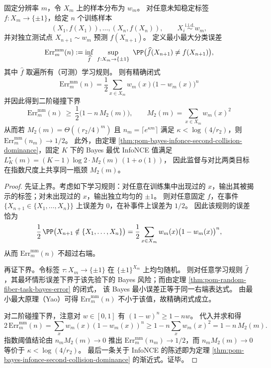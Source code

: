\begin{theorem}[二阶碰撞作为监督与对比学习的共同指数瓶颈]\label{thm:pom-second-order-collision-common-bottleneck}
固定分辨率 \(m\)，令 \(X_m\) 上的样本分布为 \(w_m\)。
对任意未知稳定标签 \(f:X_m\to\{\pm1\}\)，给定 \(n\) 个训练样本
\[
(X_1,f(X_1)),\dots,(X_n,f(X_n)),\qquad X_i\stackrel{\mathrm{i.i.d.}}{\sim}w_m,
\]
并对独立测试点 \(X_{n+1}\sim w_m\) 预测 \(f(X_{n+1})\)。
定义最小最大分类误差
\[
\mathrm{Err}_m^{\mathrm{mm}}(n)
:=\inf_{\widehat f}\ \sup_{f:X_m\to\{\pm1\}}\ \PP\bigl(\widehat f(X_{n+1})\neq f(X_{n+1})\bigr),
\]
其中 \(\widehat f\) 取遍所有（可测）学习规则。
则有精确闭式
\[
\boxed{\;
\mathrm{Err}_m^{\mathrm{mm}}(n)
=\frac12\sum_{x\in X_m}w_m(x)\bigl(1-w_m(x)\bigr)^n\;}
\]
并因此得到二阶碰撞下界
\[
\boxed{\;
\mathrm{Err}_m^{\mathrm{mm}}(n)\ \ge\ \frac12\bigl(1-n\,M_2(m)\bigr),\qquad M_2(m)=\sum_{x\in X_m}w_m(x)^2\;}
\]
从而若 \(M_2(m)=\Theta((r_2/4)^m)\) 且 \(n_m=\lceil e^{\kappa m}\rceil\) 满足 \(\kappa<\log(4/r_2)\)，则 \(\mathrm{Err}_m^{\mathrm{mm}}(n_m)\to 1/2\)。
此外，由定理 \ref{thm:pom-bayes-infonce-second-collision-dominance}，固定 \(K\) 下的 Bayes 最优 InfoNCE 值满足
\(
L_K^\star(m)=(K-1)\log 2\cdot M_2(m)\,(1+o(1))
\)，
因此监督与对比两类目标在指数尺度上共享同一瓶颈 \(M_2(m)\)。
\end{theorem}
\begin{proof}
先证上界。考虑如下学习规则：对任意在训练集中出现过的 \(x\)，输出其被揭示的标签；对未出现过的 \(x\)，输出独立均匀的 \(\pm1\)。
则对任意固定 \(f\)，在事件 \(\{X_{n+1}\in\{X_1,\dots,X_n\}\}\) 上误差为 \(0\)，在补事件上误差为 \(1/2\)。
因此该规则的误差恰为
\[
\frac12\,\PP\bigl(X_{n+1}\notin\{X_1,\dots,X_n\}\bigr)
=\frac12\sum_{x\in X_m}w_m(x)\bigl(1-w_m(x)\bigr)^n,
\]
从而 \(\mathrm{Err}_m^{\mathrm{mm}}(n)\) 不超过右端。
\par
再证下界。令标签 \(\tau:X_m\to\{\pm1\}\) 在 \(\{\pm1\}^{X_m}\) 上均匀随机。
则对任意学习规则 \(\widehat f\)，其最坏情形误差下界于该先验下的 Bayes 风险；而由定理 \ref{thm:pom-random-fiber-task-bayes-error} 的闭式，
该 Bayes 最小误差正等于同一右端表达式。
由最小最大原理（Yao）可得 \(\mathrm{Err}_m^{\mathrm{mm}}(n)\) 不小于该值，故精确闭式成立。
\par
对二阶碰撞下界，注意对 \(w\in[0,1]\) 有 \((1-w)^n\ge 1-nw\)。
代入并求和得
\[
2\,\mathrm{Err}_m^{\mathrm{mm}}(n)=\sum_x w_m(x)(1-w_m(x))^n
\ge 1-n\sum_x w_m(x)^2
=1-n\,M_2(m).
\]
指数阈值结论由 \(n_mM_2(m)\to 0\) 推出 \(\mathrm{Err}_m^{\mathrm{mm}}(n_m)\to 1/2\)，而 \(n_mM_2(m)\to 0\) 等价于 \(\kappa<\log(4/r_2)\)。
最后一条关于 InfoNCE 的陈述即为定理 \ref{thm:pom-bayes-infonce-second-collision-dominance} 的渐近式。证毕。
\end{proof}

\endinput
